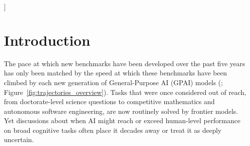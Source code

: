 \documentclass[letterpaper,twocolumn]{article}
\begin{document}

\vskip 0.3in
]

\section{Introduction}
\label{sec:introduction}

The pace at which new benchmarks have been developed over the past five years has only been matched by the speed at which these benchmarks have been climbed by each new generation of General-Purpose AI (GPAI) models (\citet{epoch_ai_ai_2024, bengio_international_2025, aisi_frontier_2025}; Figure~\ref{fig:trajectories_overview}).
Tasks that were once considered out of reach, from doctorate-level science questions to competitive mathematics and autonomous software engineering, are now routinely solved by frontier models.
Yet discussions about when AI might reach or exceed human-level performance on broad cognitive tasks often place it decades away \citep{grace_when_2018, grace_thousands_2025} or treat it as deeply uncertain.
\end{document}
